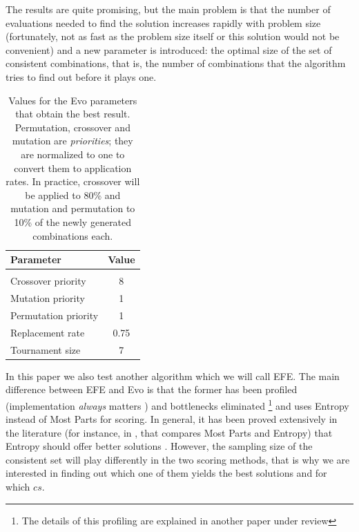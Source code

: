 \documentclass[conference]{IEEEtran}
\begin{document}
The results are quite promising,
 but the main problem is that the number of evaluations needed to find the solution increases rapidly with problem size (fortunately, not as fast as the problem size itself or this solution would not be convenient) and a new parameter is introduced: the optimal size of the set of consistent combinations, that is, the number of combinations that the algorithm tries to find out before it plays one.  

\begin{table}[t!]
\centering 
\caption{Values for the Evo parameters that obtain the best
  result. Permutation, crossover and mutation are {\em priorities};
  they are normalized to one to convert them to application rates. In
  practice, crossover will be applied to 80\% and mutation and
  permutation to 10\% of the newly generated combinations each. \label{tab:params}}
\begin{tabular}{lc}
\hline
Parameter & Value \\
\hline \\
Crossover priority & 8 \\
Mutation  priority & 1 \\
Permutation priority  & 1 \\
Replacement rate  & 0.75 \\ 
Tournament size & 7 \\
\hline
\end{tabular}
\end{table}

In this paper we also test another algorithm which we will call
EFE. 
The main difference between EFE and Evo is that the former has
been profiled (implementation {\em always} matters
\cite{DBLP:conf/iwann/MereloRACML11}) and bottlenecks eliminated
\footnote{The details of this profiling are explained in another paper
  under review}
and uses Entropy instead of Most Parts for scoring. In general, it has
been proved extensively in the literature (for instance, in
\cite{mm:evostar13}, that compares Most Parts and Entropy) that
Entropy should offer better solutions . However,
the sampling size of the consistent set will play differently in the two scoring methods,
that is why we are interested in finding out which one of them yields
the best solutions and for which $cs$. 
\end{document}
